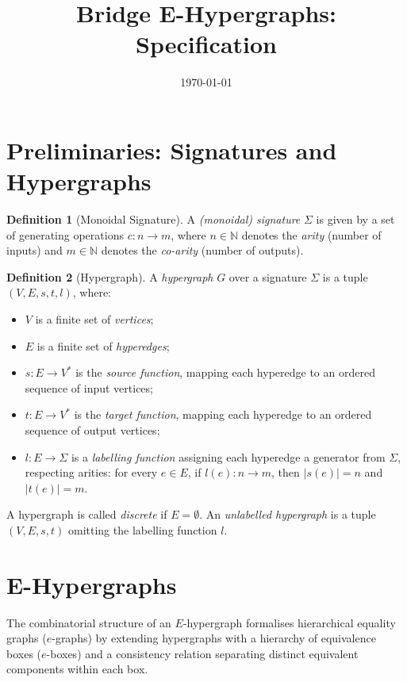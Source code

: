\documentclass[11pt,a4paper]{article}
\title{Bridge E-Hypergraphs: Specification}
\author{}
\date{\today}
\theoremstyle{definition}
\newtheorem{definition}{Definition}[section]
\theoremstyle{plain}
\begin{document}
\maketitle

\section{Preliminaries: Signatures and Hypergraphs}

\begin{definition}[Monoidal Signature]
A \emph{(monoidal) signature} $\Sigma$ is given by a set of generating operations $c \colon n \to m$, where $n \in \mathbb{N}$ denotes the \emph{arity} (number of inputs) and $m \in \mathbb{N}$ denotes the \emph{co-arity} (number of outputs).
\end{definition}

\begin{definition}[Hypergraph]
A \emph{hypergraph} $G$ over a signature $\Sigma$ is a tuple $(V, E, s, t, l)$, where:
\begin{itemize}
    \item $V$ is a finite set of \emph{vertices};
    \item $E$ is a finite set of \emph{hyperedges};
    \item $s \colon E \to V^*$ is the \emph{source function}, mapping each hyperedge to an ordered sequence of input vertices;
    \item $t \colon E \to V^*$ is the \emph{target function}, mapping each hyperedge to an ordered sequence of output vertices;
    \item $l \colon E \to \Sigma$ is a \emph{labelling function} assigning each hyperedge a generator from $\Sigma$, respecting arities: for every $e \in E$, if $l(e) \colon n \to m$, then $|s(e)| = n$ and $|t(e)| = m$.
\end{itemize}
A hypergraph is called \emph{discrete} if $E = \emptyset$. An \emph{unlabelled hypergraph} is a tuple $(V, E, s, t)$ omitting the labelling function $l$.
\end{definition}

\section{E-Hypergraphs}

The combinatorial structure of an $E$-hypergraph formalises hierarchical equality graphs ($e$-graphs) by extending hypergraphs with a hierarchy of equivalence boxes ($e$-boxes) and a consistency relation separating distinct equivalent components within each box.
\end{document}
